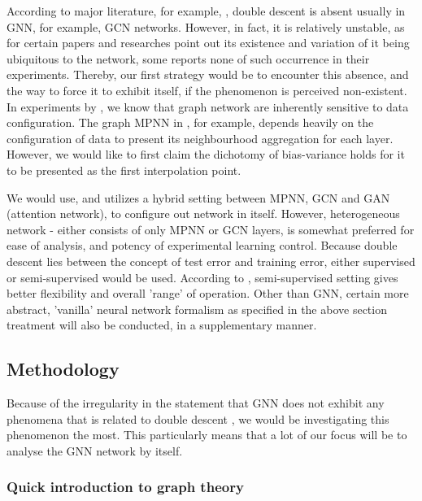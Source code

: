 \documentclass[twoside,10pt]{article}
\begin{document}
According to major literature, for example, \cite{shi2024homophilymodulatesdoubledescent}, double descent is absent usually in GNN, for example, GCN networks. However, in fact, it is relatively unstable, as for certain papers and researches point out its existence and variation of it being ubiquitous to the network, some reports none of such occurrence in their experiments. Thereby, our first strategy would be to encounter this absence, and the way to force it to exhibit itself, if the phenomenon is perceived non-existent. In experiments by \cite{shi2024homophilymodulatesdoubledescent,buschjager_generalized_2020}, we know that graph network are inherently sensitive to data configuration. The graph MPNN in \cite{GRP_Hamilton}, for example, depends heavily on the configuration of data to present its neighbourhood aggregation for each layer. However, we would like to first claim the dichotomy of bias-variance holds for it to be presented as the first interpolation point.

We would use, and utilizes a hybrid setting between MPNN, GCN and GAN (attention network), to configure out network in itself. However, heterogeneous network - either consists of only MPNN or GCN layers, is somewhat preferred for ease of analysis, and potency of experimental learning control. Because double descent lies between the concept of test error and training error, either supervised or semi-supervised would be used. According to \cite{shi2024homophilymodulatesdoubledescent}, semi-supervised setting gives better flexibility and overall 'range' of operation. Other than GNN, certain more abstract, 'vanilla' neural network formalism as specified in the above section treatment will also be conducted, in a supplementary manner. 

\subsection{Methodology}

Because of the irregularity in the statement that GNN does not exhibit any phenomena that is related to double descent \cite{shi2024homophilymodulatesdoubledescent}, we would be investigating this phenomenon the most. This particularly means that a lot of our focus will be to analyse the GNN network by itself. 

\subsubsection{Quick introduction to graph theory}
\end{document}
